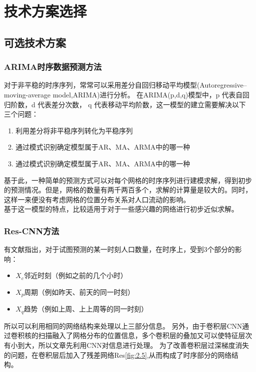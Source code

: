\section{技术方案选择}
\subsection{可选技术方案}
\subsubsection*{ARIMA时序数据预测方法}
\label{arima}
对于非平稳的时序序列，常常可以采用差分自回归移动平均模型(Autoregressive–moving-average model,ARIMA)进行分析\cite{whittle1966prediction,Hannan1970Multiple}。
在ARIMA(p,d,q)模型中，p 代表自回归阶数，d 代表差分次数， q 代表移动平均阶数，这一模型的建立需要解决以下三个问题：
\begin{enumerate}
	\item 利用差分将非平稳序列转化为平稳序列
	\item 通过模式识别确定模型属于AR、MA、ARMA中的哪一种
	\item 通过模式识别确定模型属于AR、MA、ARMA中的哪一种
\end{enumerate}
\indent 基于此，一种简单的预测方式可以对每个网格的时序序列进行建模求解，得到初步的预测情况。但是，网格的数量有两千两百多个，求解的计算量是较大的。同时，这样一来便没有考虑网格的位置分布关系对人口流动的影响。\\
\indent 基于这一模型的特点，比较适用于对于一些感兴趣的网络进行初步近似求解。
\subsubsection*{Res-CNN方法}
有文献\cite{Zhang2016Deep}指出，对于试图预测的某一时刻人口数量，在时序上，受到3个部分的影响：
\begin{itemize}
	\item $X_c$邻近时刻（例如之前的几个小时）
	\item $X_p$周期（例如昨天、前天的同一时刻）
	\item $X_q$趋势（例如上周、上上周等的同一时刻）
\end{itemize}
所以可以利用相同的网络结构来处理以上三部分信息。
\indent 另外，由于卷积层CNN通过卷积核的扫描融入了网格分布的位置信息，多个卷积层的叠加又可以使特征层次有小到大，所以文章先利用CNN对信息进行处理。
为了改善卷积层过深梯度消失的问题，在卷积层后加入了残差网络Res\ref{fig:2.5},从而构成了时序部分的网络结构。

